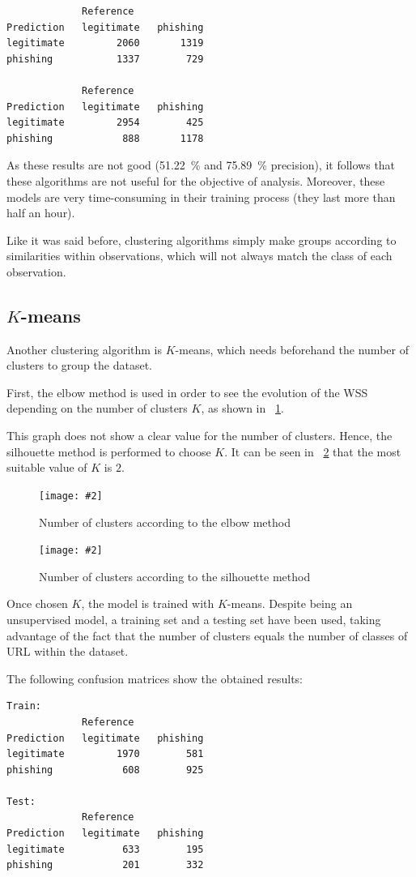 \documentclass[12pt, a4paper]{article}
\newcommand*{\figref}[1]{\figurename~\ref{fig:#1}}
\newcommand{\figcaption}[4][H]{
  \begin{figure}[#1]
    \centering
    \texttt{[image: \#2]}
    \caption{#3}
    \label{fig:#2}
  \end{figure}
}
\newcommand*{\kmeans}{$K$-means}
\begin{document}
      \begin{verbatim}
             Reference
Prediction   legitimate   phishing
legitimate         2060       1319
phishing           1337        729

             Reference
Prediction   legitimate   phishing
legitimate         2954        425
phishing            888       1178
      \end{verbatim}

      As these results are not good (\SI{51.22}{\percent} and \SI{75.89}{\percent} precision), it follows that these algorithms are not useful for the objective of analysis. Moreover, these models are very time-consuming in their training process (they last more than half an hour).

      Like it was said before, clustering algorithms simply make groups according to similarities within observations, which will not always match the class of each observation.

    \subsection{\kmeans}

      Another clustering algorithm is \kmeans, which needs beforehand the number of clusters to group the dataset.

      First, the elbow method is used in order to see the evolution of the WSS depending on the number of clusters $K$, as shown in \figref{elbow.png}.

      This graph does not show a clear value for the number of clusters. Hence, the silhouette method is performed to choose $K$. It can be seen in \figref{silhouette.png} that the most suitable value of $K$ is $2$.

      \figcaption{elbow.png}{Number of clusters according to the elbow method}{1}

      \figcaption{silhouette.png}{Number of clusters according to the silhouette method}{1}

      \newpage

      Once chosen $K$, the model is trained with \kmeans. Despite being an unsupervised model, a training set and a testing set have been used, taking advantage of the fact that the number of clusters equals the number of classes of URL within the dataset.

      The following confusion matrices show the obtained results:

      \begin{verbatim}
Train:
             Reference
Prediction   legitimate   phishing
legitimate         1970        581
phishing            608        925

Test:
             Reference
Prediction   legitimate   phishing
legitimate          633        195
phishing            201        332
      \end{verbatim}
\end{document}

